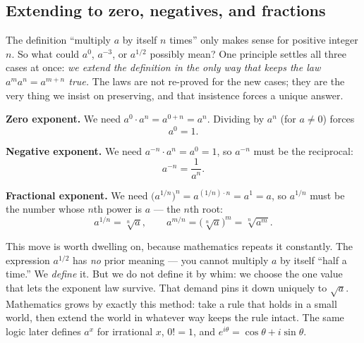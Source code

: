 \subsection{Extending to zero, negatives, and fractions}

The definition ``multiply $a$ by itself $n$ times'' only makes sense for positive
integer $n$. So what could $a^0$, $a^{-3}$, or $a^{1/2}$ possibly mean? One
principle settles all three cases at once: \emph{we extend the definition in the only way that
keeps the law $a^m a^n = a^{m+n}$ true.} The laws are not re-proved for the new
cases; they are the very thing we insist on preserving, and that insistence forces
a unique answer.

\textbf{Zero exponent.} We need $a^0 \cdot a^n = a^{0+n} = a^n$. Dividing by $a^n$
(for $a \neq 0$) forces
\[
  a^0 = 1.
\]

\textbf{Negative exponent.} We need $a^{-n} \cdot a^n = a^{0} = 1$, so $a^{-n}$
must be the reciprocal:
\[
  a^{-n} = \frac{1}{a^n}.
\]

\textbf{Fractional exponent.} We need $\bigl(a^{1/n}\bigr)^n = a^{(1/n)\cdot n} =
a^1 = a$, so $a^{1/n}$ must be the number whose $n$th power is $a$ --- the $n$th
root:
\[
  a^{1/n} = \sqrt[n]{a}, \qquad a^{m/n} = \bigl(\sqrt[n]{a}\bigr)^m = \sqrt[n]{a^m}.
\]

\begin{whybox}
This move is worth dwelling on, because mathematics repeats it constantly.
The expression $a^{1/2}$ has \emph{no} prior meaning --- you cannot multiply $a$
by itself ``half a time.'' We \emph{define} it. But we do not define it by whim:
we choose the one value that lets the exponent law survive. That demand pins it
down uniquely to $\sqrt a$. Mathematics grows by exactly this method: take a rule
that holds in a small world, then extend the world in whatever way keeps the rule
intact. The same logic later defines $a^x$ for irrational $x$, $0! = 1$, and
$e^{i\theta} = \cos\theta + i\sin\theta$.
\end{whybox}

